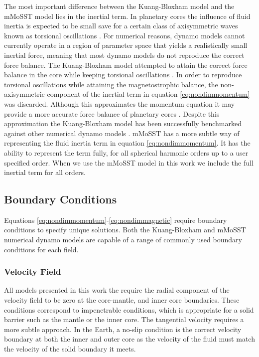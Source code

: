 The most important difference between the Kuang-Bloxham model and the mMoSST model lies in the inertial term. In planetary cores the influence of fluid inertia is expected to be small save for a certain class of axisymmetric waves known as torsional oscillations \citep{dumberry2003}. For numerical reasons, dynamo models cannot currently operate in a region of parameter space that yields a realistically small inertial force, meaning that most dynamo models do not reproduce the correct force balance. The Kuang-Bloxham model attempted to attain the correct force balance in the core while keeping torsional oscillations \citep{kuangandbloxham1999}. In order to reproduce torsional oscillations while attaining the magnetostrophic balance, the non-axisymmetric component of the inertial term in equation \ref{eq:nondimmomentum} was discarded. Although this approximates the momentum equation it may provide a more accurate force balance of planetary cores \citep{dumberry2003}. Despite this approximation the Kuang-Bloxham model has been successfully benchmarked against other numerical dynamo models \citep{dharmaraj2013}. mMoSST has a more subtle way of representing the fluid inertia term in equation \ref{eq:nondimmomentum}. It has the ability to represent the term fully, for all spherical harmonic orders up to a user specified order. When we use the mMoSST model in this work we include the full inertial term for all orders.

\subsection{Boundary Conditions}
Equations \ref{eq:nondimmomentum}-\ref{eq:nondimmagnetic} require boundary conditions to specify unique solutions. Both the Kuang-Bloxham and mMoSST numerical dynamo models are capable of a range of commonly used boundary conditions for each field.
\subsubsection{Velocity Field}
All models presented in this work the require the radial component of the velocity field to be zero at the core-mantle, and inner core boundaries. These conditions correspond to  impenetrable conditions, which is appropriate for a solid barrier such as the mantle or the inner core. The tangential velocity requires a more subtle approach. In the Earth, a no-slip  condition is the correct velocity boundary at both the inner and outer core as the velocity of the fluid must match the velocity of the solid boundary it meets. 


